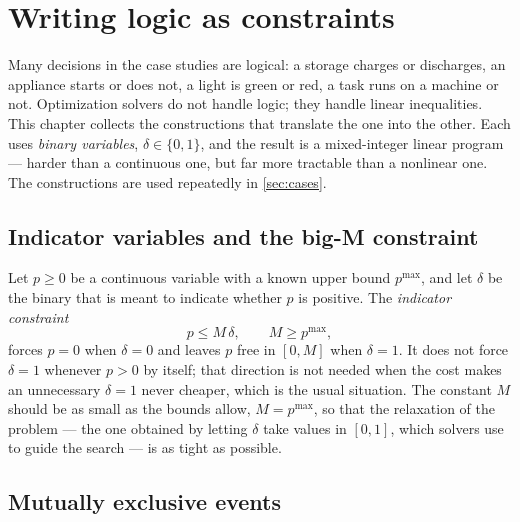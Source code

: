 \section{Writing logic as constraints}
\label{sec:toolbox}

Many decisions in the case studies are logical: a storage charges or discharges, an appliance
starts or does not, a light is green or red, a task runs on a machine or not. Optimization
solvers do not handle logic; they handle linear inequalities. This chapter collects the
constructions that translate the one into the other. Each uses \emph{binary variables},
$\delta \in \{0,1\}$, and the result is a mixed-integer linear program --- harder than a
continuous one, but far more tractable than a nonlinear one. The constructions are used
repeatedly in \cref{sec:cases}.

\subsection{Indicator variables and the big-M constraint}
\label{sec:bigM}

Let $p \ge 0$ be a continuous variable with a known upper bound $p^{\max}$, and let $\delta$ be
the binary that is meant to indicate whether $p$ is positive. The \emph{indicator constraint}
\begin{equation}
  p \le M\,\delta, \qquad M \ge p^{\max},
  \label{eq:bigM}
\end{equation}
forces $p = 0$ when $\delta = 0$ and leaves $p$ free in $[0, M]$ when $\delta = 1$. It does not
force $\delta = 1$ whenever $p > 0$ by itself; that direction is not needed when the cost makes
an unnecessary $\delta = 1$ never cheaper, which is the usual situation. The constant $M$ should
be as small as the bounds allow, $M = p^{\max}$, so that the relaxation of the problem --- the
one obtained by letting $\delta$ take values in $[0,1]$, which solvers use to guide the search
--- is as tight as possible.

\subsection{Mutually exclusive events}

